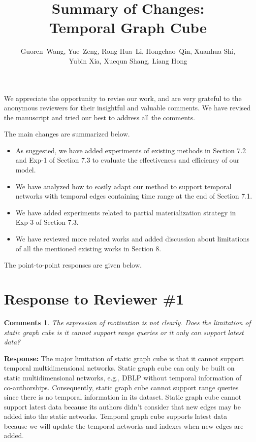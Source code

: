 \documentclass{article}
\title{Summary of Changes: \\Temporal Graph Cube}
\author{Guoren~Wang,
	Yue~Zeng,
	Rong-Hua~Li,
	Hongchao~Qin,
	Xuanhua Shi,\\
	Yubin Xia, 
	Xuequn Shang, 
	Liang Hong
}
\date{}
\newtheorem{Comments}{\textbf{Comments}}
\begin{document}
\maketitle

We appreciate the opportunity to revise our work, and are very grateful to the anonymous reviewers for their insightful and valuable comments. We have revised the manuscript and tried our best to address all the comments. 

The main changes are summarized below.
\begin{itemize}

\item As suggested, we have added experiments of existing methods in Section 7.2 and Exp-1 of Section 7.3 to evaluate the effectiveness and efficiency of our model.
\item We have analyzed how to easily adapt our method to support temporal networks with temporal edges containing time range at the end of Section 7.1.
\item We have added experiments related to partial materialization strategy in Exp-3 of Section 7.3.
\item We have reviewed more related works and added discussion about limitations of all the mentioned existing works in Section 8.

\end{itemize}

The point-to-point responses are given below.
	
\section{Response to Reviewer \#1}
\begin{Comments}
The expression of motivation is not clearly. Does the limitation of static graph cube is it cannot support range queries or it only can support latest data?
\end{Comments}
\noindent \textbf{Response:} The major limitation of static graph cube is that it cannot support temporal multidimensional networks. Static graph cube can only be built on static multidimensional networks, e.g., DBLP without temporal information of co-authorships. Consequently, static graph cube cannot support range queries since there is no temporal information in its dataset. Static graph cube cannot support latest data because its authors didn't consider that new edges may be added into the static networks. Temporal graph cube supports latest data because we will update the temporal networks and indexes when new edges are added.
\end{document}
